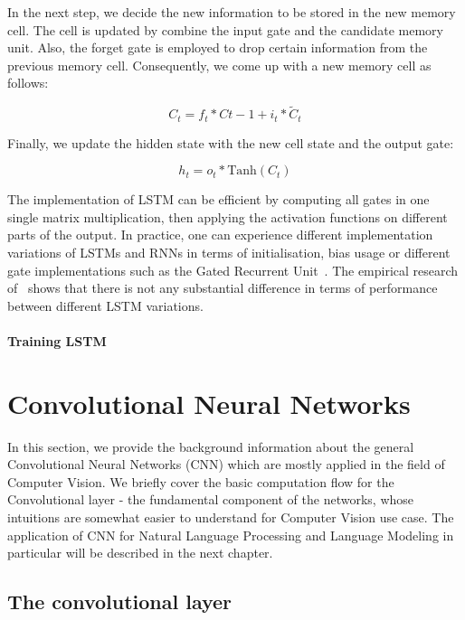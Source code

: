 In the next step, we decide the new information to be stored in the new memory cell. The cell is updated by combine the input gate and the candidate memory unit. Also, the forget gate is employed to drop certain information from the previous memory cell. Consequently, we come up with a new memory cell as follows:

\begin{equation}
C_t = f_t * C{t-1} + i_t * \tilde{C}_t
\label{eq:lstm2}
\end{equation}

Finally, we update the hidden state with the new cell state and the output gate:

\begin{equation}
h_t = o_t * \text{Tanh}(C_t)
\label{eq:lstm3}
\end{equation}

The implementation of LSTM can be efficient by computing all gates in one single matrix multiplication, then applying the activation functions on different parts of the output. In practice, one can experience different implementation variations of LSTMs and RNNs in terms of initialisation, bias usage or different gate implementations such as the Gated Recurrent Unit~\cite{cho2014learning}. The empirical research of~\cite{zaremba2015empirical} shows that there is not any substantial difference in terms of performance between different LSTM variations. 

\paragraph{Training LSTM}



\section{Convolutional Neural Networks}

In this section, we provide the background information about the general Convolutional Neural Networks (CNN) which are mostly applied in the field of Computer Vision. We briefly cover the basic 
computation flow for the Convolutional layer - the fundamental component of the networks, whose intuitions are somewhat easier to understand for Computer Vision use case. The application of CNN for 
Natural Language Processing and Language Modeling in particular will be described in the next chapter.


\subsection{The convolutional layer}

